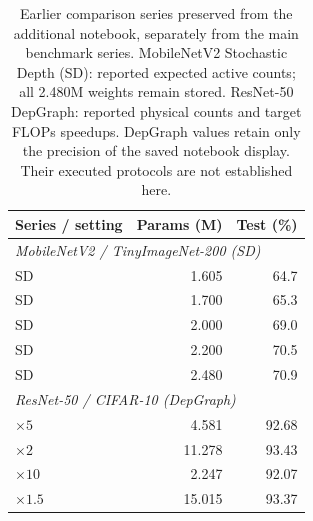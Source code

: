 \begin{table}[t]
  \caption{Earlier comparison series preserved from the additional
    notebook, separately from the main benchmark series.
    MobileNetV2 Stochastic Depth (SD): reported expected active
    counts; all 2.480M weights remain stored. ResNet-50 DepGraph:
    reported physical counts and target FLOPs speedups.
    DepGraph values retain only the precision of the saved notebook
    display. Their executed protocols are not established here.}
  \label{tab:notebook-historical-comparators}
  \centering
  \small
  \begin{tabular}{@{}lrr@{}}
    \toprule
    Series / setting & Params (M) & Test (\%) \\
    \midrule
    \multicolumn{3}{l}{\textit{MobileNetV2 / TinyImageNet-200 (SD)}} \\
    SD & 1.605 & 64.7 \\
    SD & 1.700 & 65.3 \\
    SD & 2.000 & 69.0 \\
    SD & 2.200 & 70.5 \\
    SD & 2.480 & 70.9 \\
    \midrule
    \multicolumn{3}{l}{\textit{ResNet-50 / CIFAR-10 (DepGraph)}} \\
    $\times5$ & 4.581 & 92.68 \\
    $\times2$ & 11.278 & 93.43 \\
    $\times10$ & 2.247 & 92.07 \\
    $\times1.5$ & 15.015 & 93.37 \\
    \bottomrule
  \end{tabular}
\end{table}
